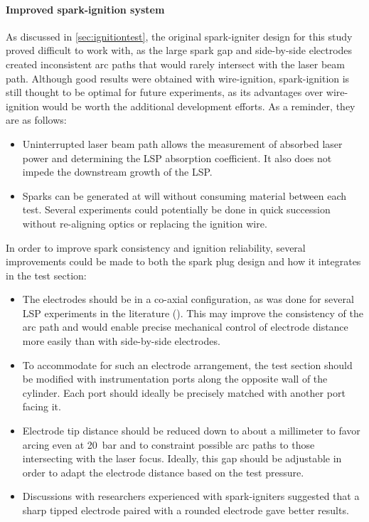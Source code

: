         \paragraph{Improved spark-ignition system} As discussed in \autoref{sec:ignitiontest}, the original spark-igniter design for this study proved difficult to work with, as the large spark gap and side-by-side electrodes created inconsistent arc paths that would rarely intersect with the laser beam path. Although good results were obtained with wire-ignition, spark-ignition is still thought to be optimal for future experiments, as its advantages over wire-ignition would be worth the additional development efforts. As a reminder, they are as follows:
        \begin{itemize}
            \item Uninterrupted laser beam path allows the measurement of absorbed laser power and determining the LSP absorption coefficient. It also does not impede the downstream growth of the LSP.
            \item Sparks can be generated at will without consuming material between each test. Several experiments could potentially be done in quick succession without re-aligning optics or replacing the ignition wire.
        \end{itemize}
        In order to improve spark consistency and ignition reliability, several improvements could be made to both the spark plug design and how it integrates in the test section:
        \begin{itemize}
            \item The electrodes should be in a co-axial configuration, as was done for several LSP experiments in the literature (\textcite{luCharacteristicDiagnosticsLaserStabilized2022, zimakovInteractionNearIRLaser2016,matsuiGeneratingConditionsArgon2019}). This may improve the consistency of the arc path and would enable precise mechanical control of electrode distance more easily than with side-by-side electrodes.
            \item To accommodate for such an electrode arrangement, the test section should be modified with instrumentation ports along the opposite wall of the cylinder. Each port should ideally be precisely matched with another port facing it.
            \item Electrode tip distance should be reduced down to about a millimeter to favor arcing even at \qty{20}{bar} and to constraint possible arc paths to those intersecting with the laser focus. Ideally, this gap should be adjustable in order to adapt the electrode distance based on the test pressure.
            \item Discussions with researchers experienced with spark-igniters suggested that a sharp tipped electrode paired with a rounded electrode gave better results.
        \end{itemize}

